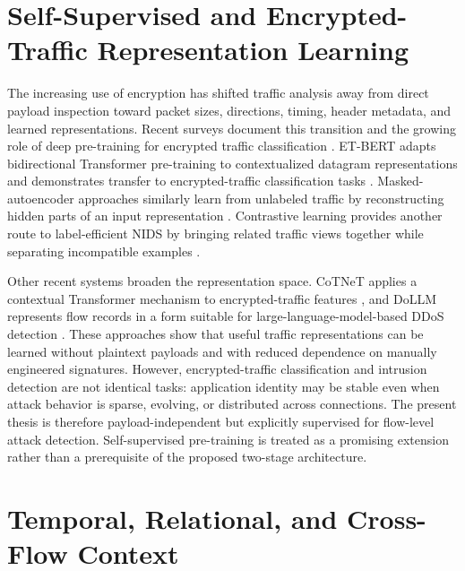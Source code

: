 \documentclass[11pt,fleqn]{report}
\begin{document}
\section{Self-Supervised and Encrypted-Traffic Representation Learning}
\label{subsec:rw_ssl_encrypted}

The increasing use of encryption has shifted traffic analysis away from direct payload inspection toward packet sizes, directions, timing, header metadata, and learned representations. Recent surveys document this transition and the growing role of deep pre-training for encrypted traffic classification \cite{Sharma2025EncryptedSurvey,Dong2025EncryptedPretrain}. ET-BERT adapts bidirectional Transformer pre-training to contextualized datagram representations and demonstrates transfer to encrypted-traffic classification tasks \cite{Lin2022ETBERT}. Masked-autoencoder approaches similarly learn from unlabeled traffic by reconstructing hidden parts of an input representation \cite{Zhao2024MAETraffic,2024MAETraffic}. Contrastive learning provides another route to label-efficient NIDS by bringing related traffic views together while separating incompatible examples \cite{Li2024Contrastive}.

Other recent systems broaden the representation space. CoTNeT applies a contextual Transformer mechanism to encrypted-traffic features \cite{Huang2024CoTNet}, and DoLLM represents flow records in a form suitable for large-language-model-based DDoS detection \cite{Li2024DoLLM}. These approaches show that useful traffic representations can be learned without plaintext payloads and with reduced dependence on manually engineered signatures. However, encrypted-traffic classification and intrusion detection are not identical tasks: application identity may be stable even when attack behavior is sparse, evolving, or distributed across connections. The present thesis is therefore payload-independent but explicitly supervised for flow-level attack detection. Self-supervised pre-training is treated as a promising extension rather than a prerequisite of the proposed two-stage architecture.

\section{Temporal, Relational, and Cross-Flow Context}
\label{subsec:rw_cross_flow}
\end{document}
